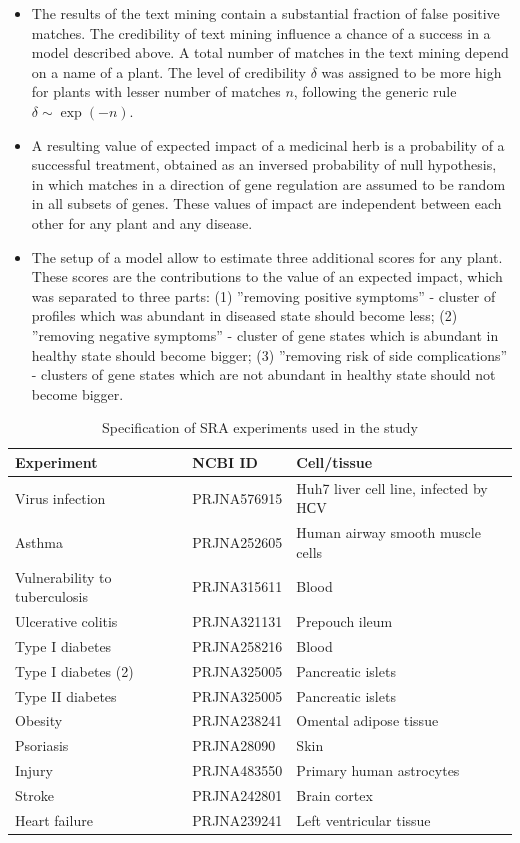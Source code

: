 \documentclass[12pt,aps]{revtex4}
\begin{document}
\begin{itemize}
\item 
The results of the text mining contain a substantial fraction of false positive matches. The credibility of text mining influence a chance of a success in a model described above. A total number of matches in the text mining depend on a name of a plant. The level of credibility $\delta$ was assigned to be more high for plants with lesser number of matches $n$, following the generic rule $\delta \sim \exp( -n )$. 

\item
A resulting value of expected impact of a medicinal herb is a probability of a successful treatment, obtained as an inversed probability of null hypothesis, in which matches in a direction of gene regulation are assumed to be random in all subsets of genes. These values of impact are independent between each other for any plant and any disease. 

\item
The setup of a model allow to estimate three additional scores for any plant. These scores are the contributions to the value of an expected impact, which was separated to three parts: (1) ''removing positive symptoms'' - cluster of profiles which was abundant in diseased state should become less; (2) ''removing negative symptoms'' - cluster of gene states which is abundant in healthy state should become bigger; (3) ''removing risk of side complications'' - clusters of gene states which are not abundant in healthy state should not become bigger.

\end{itemize}

\begin{table}[h] \label{table2}
\caption{Specification of SRA experiments used in the study}
\begin{tabular} {|l|l|l|}
\hline
Experiment&NCBI ID&Cell/tissue\\
\hline
Virus infection&PRJNA576915&Huh7 liver cell line, infected by HСV\\
Asthma&PRJNA252605&Human airway smooth muscle cells \\
Vulnerability to tuberculosis&PRJNA315611&Blood \\
Ulcerative colitis&PRJNA321131&Prepouch ileum  \\
Type I diabetes&PRJNA258216&Blood \\
Type I diabetes (2)&PRJNA325005&Pancreatic islets  \\
Type II diabetes&PRJNA325005&Pancreatic islets  \\
Obesity&PRJNA238241 &Omental adipose tissue \\
Psoriasis&PRJNA28090&Skin \\
Injury&PRJNA483550 &Primary human astrocytes\\ 
Stroke&PRJNA242801&Brain cortex\\
Heart failure&PRJNA239241&Left ventricular tissue\\ 
\hline
\end{tabular}
\label{table1}
\end{table}
\end{document}
